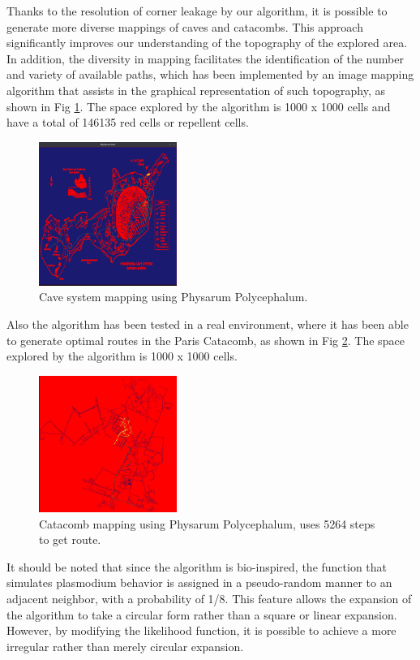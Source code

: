\documentclass[conference]{IEEEtran}
\begin{document}
    \vskip 0.5cm
    Thanks to the resolution of corner leakage by our algorithm, it is possible to generate more 
        diverse mappings of caves and catacombs. This approach significantly improves our understanding 
        of the topography of the explored area. In addition, the diversity in mapping facilitates the identification 
        of the number and variety of available paths, which has been implemented by an image mapping algorithm that 
        assists in the graphical representation of such topography, as shown in Fig \ref{fig:CaveSystemPhysarum}. The space 
        explored by the algorithm is 1000 x 1000 cells and have a total of 146135 red cells or repellent cells.
    \vskip 0.2cm
    \begin{figure}[htbp]
        \centerline{\includegraphics[width=0.40\textwidth]{./images/CaveSystemPhysarum.png}}
        \caption{Cave system mapping using Physarum Polycephalum.}
        \label{fig:CaveSystemPhysarum}
    \end{figure}
    \vskip 0.2cm
    Also the algorithm has been tested in a real environment, where it has been able to generate 
        optimal routes in the Paris Catacomb, as shown in Fig \ref{fig:Catacomb}. The space
        explored by the algorithm is 1000 x 1000 cells.
    \vskip 0.2cm
    \begin{figure}[htbp]
        \centerline{\includegraphics[width=0.40\textwidth]{./images/CatacoumbParis.png}}
        \caption{Catacomb mapping using Physarum Polycephalum, uses 5264 steps to get route.}
        \label{fig:Catacomb}
    \end{figure}
    It should be noted that since the algorithm is bio-inspired, the function that simulates plasmodium behavior 
        is assigned in a pseudo-random manner to an adjacent neighbor, with a probability of 1/8. This feature allows 
        the expansion of the algorithm to take a circular form rather than a square or linear expansion. However, by 
        modifying the likelihood function, it is possible to achieve a more irregular rather than merely circular expansion.
\end{document}
